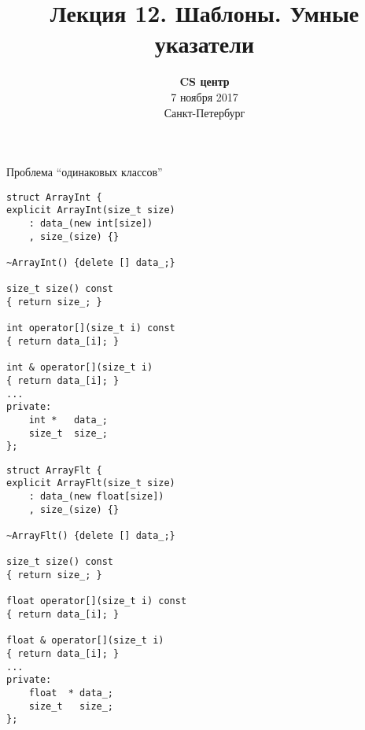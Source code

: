 \documentclass{beamer}
\title{Лекция 12. Шаблоны. Умные указатели}
\date{
   \textbf{CS центр}\\
   7 ноября 2017 \\
   Санкт-Петербург
}
\begin{document}
\begin{frame} 
  \titlepage
\end{frame}

\begin{frame}[fragile]{Проблема ``одинаковых классов''}
\small
\begin{minipage}{.47\textwidth}
    \begin{lstlisting}
struct ArrayInt {
explicit ArrayInt(size_t size) 
    : data_(new int[size])
    , size_(size) {}

~ArrayInt() {delete [] data_;}

size_t size() const 
{ return size_; }

int operator[](size_t i) const 
{ return data_[i]; }

int & operator[](size_t i)       
{ return data_[i]; }
...
private:
    int *   data_;
    size_t  size_;
};
    \end{lstlisting}
\end{minipage}\hspace{.05\textwidth}%
\begin{minipage}{.47\textwidth}
    \begin{lstlisting}
struct ArrayFlt {
explicit ArrayFlt(size_t size) 
    : data_(new float[size])
    , size_(size) {}

~ArrayFlt() {delete [] data_;}

size_t size() const 
{ return size_; }

float operator[](size_t i) const 
{ return data_[i]; }

float & operator[](size_t i)       
{ return data_[i]; }
...
private:
    float  * data_;
    size_t   size_;
};
    \end{lstlisting}
\end{minipage}
\end{frame}
\end{document}

